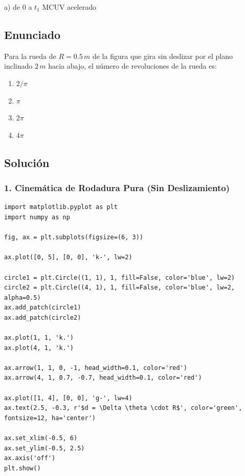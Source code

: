 \documentclass[12pt, a4paper]{article}
\begin{document}
\begin{tcolorbox}[colback=green!5!white, colframe=green!50!black, title=Respuesta Final]
\centering \Large a) de $0$ a $t_1$ MCUV acelerado
\end{tcolorbox}

\newpage

\subsection*{Enunciado}
Para la rueda de $R = 0.5\,\si{m}$ de la figura que gira sin deslizar por el plano inclinado $2\,\si{m}$ hacia abajo, el número de revoluciones de la rueda es:

\begin{center}
\end{center}

\begin{enumerate}[label=\alph*)]
    \item $2/\pi$
    \item $\pi$
    \item $2\pi$
    \item $4\pi$
\end{enumerate}

\subsection*{Solución}

\subsubsection*{1. Cinemática de Rodadura Pura (Sin Deslizamiento)}

\begin{verbatim}
import matplotlib.pyplot as plt
import numpy as np

fig, ax = plt.subplots(figsize=(6, 3))

ax.plot([0, 5], [0, 0], 'k-', lw=2)

circle1 = plt.Circle((1, 1), 1, fill=False, color='blue', lw=2)
circle2 = plt.Circle((4, 1), 1, fill=False, color='blue', lw=2, alpha=0.5)
ax.add_patch(circle1)
ax.add_patch(circle2)

ax.plot(1, 1, 'k.')
ax.plot(4, 1, 'k.')

ax.arrow(1, 1, 0, -1, head_width=0.1, color='red')
ax.arrow(4, 1, 0.7, -0.7, head_width=0.1, color='red')

ax.plot([1, 4], [0, 0], 'g-', lw=4)
ax.text(2.5, -0.3, r'$d = \Delta \theta \cdot R$', color='green', fontsize=12, ha='center')

ax.set_xlim(-0.5, 6)
ax.set_ylim(-0.5, 2.5)
ax.axis('off')
plt.show()
\end{verbatim}
\end{document}
